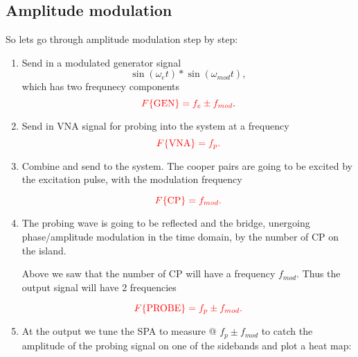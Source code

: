   \subsection{Amplitude modulation}
   So lets go through amplitude modulation step by step:
   \begin{enumerate}
   	\item Send in a modulated generator signal 
   	\[
   		\sin(\omega_e t)*\sin(\omega_{mod} t),
   	\]
   	\noindent which has two frequnecy components
   	\[
   		{\color{red}{F\lbrace\text{GEN}\rbrace = f_e\pm f_{mod}}}.
   	\]
   	\item Send in VNA signal for probing into the system at a frequency 
   	\[
   		{\color{red}{F\lbrace\text{VNA}\rbrace = f_p.}}
   	\]
   	\item Combine and send to the system. The cooper pairs are going to be excited by the excitation pulse, with the modulation frequency
   	
   	
   	\[
   	{\color{red}{F\lbrace\text{CP}\rbrace = f_{mod}.}}
   	\]
   	\item The probing wave is going to be reflected and the bridge, unergoing phase/amplitude modulation in the time domain, by the number of CP on the island.
   	
   	Above we saw that the number of CP will have a frequency $ f_{mod} $. Thus the output signal will have 2 frequencies
   	
   	\[
   	{\color{red}{F\lbrace\text{PROBE}\rbrace = f_p\pm f_{mod}.}}
   	\]
   	\item At the output we tune the SPA to measure @ $ f_p \pm f_{mod}$ to catch the amplitude of the probing signal on one of the sidebands and plot a heat map:
   \end{enumerate}

%
%

